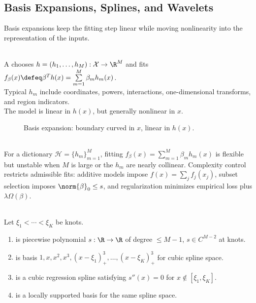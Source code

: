 \subsection{Basis Expansions, Splines, and Wavelets}

Basis expansions keep the fitting step linear while moving nonlinearity into the representation of the inputs.

\begin{definition} \label{def:sl-linear-basis-expansion} \\
A  chooses $h=(h_1,\ldots,h_M):\mathcal{X}\to\R^M$ and fits $f_\beta(x)\defeq\beta^Th(x)=\sum\limits_{m=1}^M\beta_mh_m(x)$.\\
Typical $h_m$ include coordinates, powers, interactions, one-dimensional transforms, and region indicators.\\
The model is linear in $h(x)$, but generally nonlinear in $x$.
\end{definition}

\begin{figure}[ht]
\centering

\caption{Basis expansion: boundary curved in $x$, linear in $h(x)$.}
\label{fig:sl-basis-expansion-curved-boundary}
\end{figure}

\begin{remark} \label{rem:sl-basis-dictionary-complexity} \\
For a dictionary $\mathcal{H}=\{h_m\}_{m=1}^M$, fitting $f_\beta(x)=\sum\limits_{m=1}^M\beta_mh_m(x)$ is flexible but unstable when $M$ is large or the $h_m$ are nearly collinear. Complexity control restricts admissible fits: additive models impose $f(x)=\sum_j f_j(x_j)$, subset selection imposes $\norm{\beta}_0\le s$, and regularization minimizes empirical loss plus $\lambda\Omega(\beta)$.
\end{remark}

\begin{definition} \label{def:sl-regression-splines} \\
Let $\xi_1<\cdots<\xi_K$ be knots.
\begin{enumerate}[label=(\roman*)]
\setlength{\itemsep}{0pt}
\item {} is piecewise polynomial $s:\R\to\R$ of degree $\le M-1$, $s\in C^{M-2}$ at knots.
\item {} is basis $1,x,x^2,x^3,(x-\xi_1)_+^3,\ldots,(x-\xi_K)_+^3$ for cubic spline space.
\item {} is a cubic regression spline satisfying $s''(x)=0$ for $x\notin[\xi_1,\xi_K]$.
\item {} is a locally supported basis for the same spline space.
\end{enumerate}
\end{definition}

